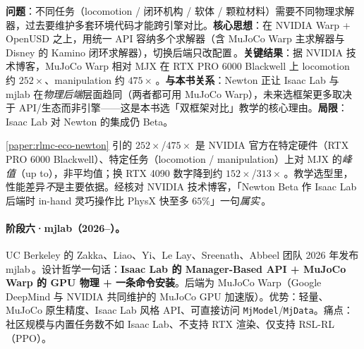 \begin{paper}\label{paper:rlmc-eco-newton}
\textbf{问题}：不同任务（locomotion / 闭环机构 / 软体 / 颗粒材料）需要不同物理求解器，过去要维护多套环境代码才能跨引擎对比。\textbf{核心思想}：在 NVIDIA Warp + OpenUSD 之上，用统一 API 容纳多个求解器（含 MuJoCo Warp 主求解器与 Disney 的 Kamino 闭环求解器），切换后端只改配置\,\cite{newton2025}。\textbf{关键结果}：据 NVIDIA 技术博客，MuJoCo Warp 相对 MJX 在 RTX PRO 6000 Blackwell 上 locomotion 约 $252\times$、manipulation 约 $475\times$\,\cite{newton2025blog}。\textbf{与本书关系}：Newton 正让 Isaac Lab 与 mjlab 在\emph{物理后端}层面趋同（两者都可用 MuJoCo Warp），未来选框架更多取决于 API/生态而非引擎——这是本书选「双框架对比」教学的核心理由。\textbf{局限}：Isaac Lab 对 Newton 的集成仍 Beta。
\end{paper}

\begin{pitfall}
\cref{paper:rlmc-eco-newton} 引的 $252\times$/$475\times$ 是 NVIDIA 官方在特定硬件（RTX PRO 6000 Blackwell）、特定任务（locomotion / manipulation）上对 MJX 的\emph{峰值}（up to），非平均值；换 RTX 4090 数字降到约 $152\times$/$313\times$\,\cite{newton2025blog}。教学选型里，性能差异\emph{不}是主要依据。经核对 NVIDIA 技术博客，「Newton Beta 作 Isaac Lab 后端时 in-hand 灵巧操作比 PhysX 快至多 $65\%$」一句\emph{属实}\,\cite{newton2025blog}。
\end{pitfall}

\paragraph{阶段六·mjlab（2026--）。}UC Berkeley 的 Zakka、Liao、Yi、Le Lay、Sreenath、Abbeel 团队 2026 年发布 mjlab\,\cite{mjlab2026}。设计哲学一句话：\textbf{Isaac Lab 的 Manager-Based API + MuJoCo Warp 的 GPU 物理 + 一条命令安装}。后端为 MuJoCo Warp（Google DeepMind 与 NVIDIA 共同维护的 MuJoCo GPU 加速版）。优势：轻量、MuJoCo 原生精度、Isaac Lab 风格 API、可直接访问 \verb|MjModel|/\allowbreak\verb|MjData|。痛点：社区规模与内置任务数不如 Isaac Lab、不支持 RTX 渲染、仅支持 RSL-RL（PPO）。

